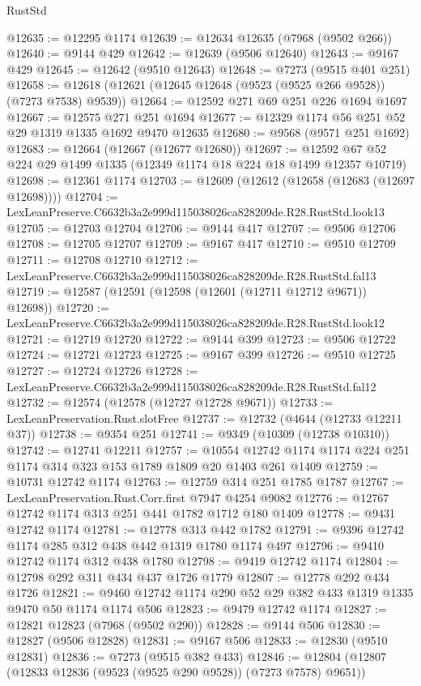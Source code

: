\begin{lexlean}{RustStd}
\begin{coremodule}
@12635 := @12295 @1174
@12639 := @12634 @12635 (@7968 (@9502 @266))
@12640 := @9144 @429
@12642 := @12639 (@9506 @12640)
@12643 := @9167 @429
@12645 := @12642 (@9510 @12643)
@12648 := @7273 (@9515 @401 @251)
@12658 := @12618 (@12621 (@12645 @12648 (@9523 (@9525 @266 @9528)) (@7273 @7538) @9539))
@12664 := @12592 @271 @69 @251 @226 @1694 @1697
@12667 := @12575 @271 @251 @1694
@12677 := @12329 @1174 @56 @251 @52 @29 @1319 @1335 @1692 @9470 @12635
@12680 := @9568 (@9571 @251 @1692)
@12683 := @12664 (@12667 (@12677 @12680))
@12697 := @12592 @67 @52 @224 @29 @1499 @1335 (@12349 @1174 @18 @224 @18 @1499 @12357 @10719)
@12698 := @12361 @1174
@12703 := @12609 (@12612 (@12658 (@12683 (@12697 @12698))))
@12704 := LexLeanPreserve.C6632b3a2e999d115038026ca828209de.R28.RustStd.look13
@12705 := @12703 @12704
@12706 := @9144 @417
@12707 := @9506 @12706
@12708 := @12705 @12707
@12709 := @9167 @417
@12710 := @9510 @12709
@12711 := @12708 @12710
@12712 := LexLeanPreserve.C6632b3a2e999d115038026ca828209de.R28.RustStd.fal13
@12719 := @12587 (@12591 (@12598 (@12601 (@12711 @12712 @9671)) @12698))
@12720 := LexLeanPreserve.C6632b3a2e999d115038026ca828209de.R28.RustStd.look12
@12721 := @12719 @12720
@12722 := @9144 @399
@12723 := @9506 @12722
@12724 := @12721 @12723
@12725 := @9167 @399
@12726 := @9510 @12725
@12727 := @12724 @12726
@12728 := LexLeanPreserve.C6632b3a2e999d115038026ca828209de.R28.RustStd.fal12
@12732 := @12574 (@12578 (@12727 @12728 @9671))
@12733 := LexLeanPreservation.Rust.slotFree
@12737 := @12732 (@4644 (@12733 @12211 @37))
@12738 := @9354 @251
@12741 := @9349 (@10309 (@12738 @10310))
@12742 := @12741 @12211
@12757 := @10554 @12742 @1174 @1174 @224 @251 @1174 @314 @323 @153 @1789 @1809 @20 @1403 @261 @1409
@12759 := @10731 @12742 @1174
@12763 := @12759 @314 @251 @1785 @1787
@12767 := LexLeanPreservation.Rust.Corr.first @7947 @4254 @9082
@12776 := @12767 @12742 @1174 @313 @251 @441 @1782 @1712 @180 @1409
@12778 := @9431 @12742 @1174
@12781 := @12778 @313 @442 @1782
@12791 := @9396 @12742 @1174 @285 @312 @438 @442 @1319 @1780 @1174 @497
@12796 := @9410 @12742 @1174 @312 @438 @1780
@12798 := @9419 @12742 @1174
@12804 := @12798 @292 @311 @434 @437 @1726 @1779
@12807 := @12778 @292 @434 @1726
@12821 := @9460 @12742 @1174 @290 @52 @29 @382 @433 @1319 @1335 @9470 @50 @1174 @1174 @506
@12823 := @9479 @12742 @1174
@12827 := @12821 @12823 (@7968 (@9502 @290))
@12828 := @9144 @506
@12830 := @12827 (@9506 @12828)
@12831 := @9167 @506
@12833 := @12830 (@9510 @12831)
@12836 := @7273 (@9515 @382 @433)
@12846 := @12804 (@12807 (@12833 @12836 (@9523 (@9525 @290 @9528)) (@7273 @7578) @9651))

\end{coremodule}
\end{lexlean}

